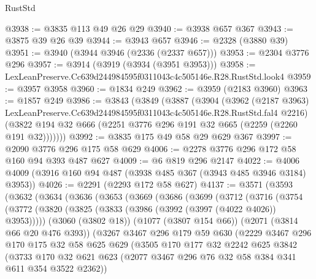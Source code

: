 \begin{lexlean}{RustStd}
\begin{coremodule}
@3938 := @3835 @113 @49 @26 @29
@3940 := @3938 @657 @367
@3943 := @3875 @39 @26 @39
@3944 := @3943 @657
@3946 := @2328 (@3880 @39)
@3951 := @3940 (@3944 @3946 (@2336 (@2337 @657)))
@3953 := @2304 @3776 @296
@3957 := @3914 (@3919 (@3934 (@3951 @3953)))
@3958 := LexLeanPreserve.Cc639d244984595f0311043c4c505146e.R28.RustStd.look4
@3959 := @3957 @3958
@3960 := @1834 @249
@3962 := @3959 (@2183 @3960)
@3963 := @1857 @249
@3986 := @3843
    (@3849
      (@3887
        (@3904
          (@3962
            (@2187 @3963)
            LexLeanPreserve.Cc639d244984595f0311043c4c505146e.R28.RustStd.fal4
            @2216)
          (@3822 @194 @32 @666 (@2251 @3776 @296 @191 @32 @665 (@2259 (@2260 @191 @32)))))))
@3992 := @3835 @175 @49 @58 @29 @629 @367
@3997 := @2090 @3776 @296 @175 @58 @629
@4006 := @2278 @3776 @296 @172 @58 @160 @94 @393 @487 @627
@4009 := @6 @819 @296 @2147
@4022 := @4006 @4009 (@3916 @160 @94 @487 (@3938 @485 @367 (@3943 @485 @3946 @3184) @3953))
@4026 := @2291 (@2293 @172 @58 @627)
@4137 := @3571
    (@3593
      (@3632
        (@3634
          (@3636
            (@3653
              (@3669
                (@3686
                  (@3699
                    (@3712
                      (@3716
                        (@3754
                          (@3772
                            (@3820 (@3825 (@3833 (@3986 (@3992 (@3997 (@4022 @4026)) @3953)))))
                            (@3060 (@3802 @18))
                            (@1077 (@3807 @154 @66))
                            (@2071 (@3814 @66 @20 @476 @393))
                            (@3267
                              @3467
                              @296
                              @179
                              @59
                              @630
                              (@2229
                                @3467
                                @296
                                @170
                                @175
                                @32
                                @58
                                @625
                                @629
                                (@3505
                                  @170
                                  @177
                                  @32
                                  @2242
                                  @625
                                  @3842
                                  (@3733
                                    @170
                                    @32
                                    @621
                                    @623
                                    (@2077 @3467 @296 @76 @32 @58 @384 @341 @611 @354 @3522 @2362))

\end{coremodule}
\end{lexlean}
